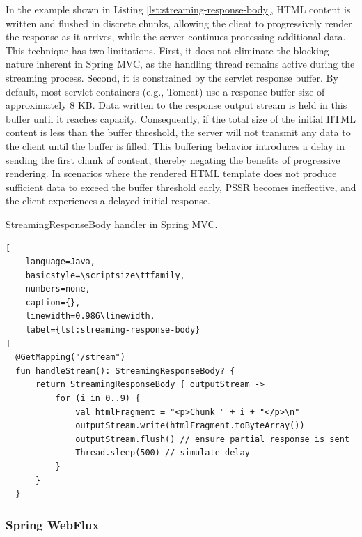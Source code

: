 \documentclass[software,article,accept,pdftex,moreauthors]{Definitions/mdpi}
\begin{document}
In the example shown in Listing \ref{lst:streaming-response-body}, HTML content is
written and flushed in discrete chunks, allowing the client to progressively
render the response as it arrives, while the server continues processing
additional data. This technique has two limitations. First, it does
not eliminate the blocking nature inherent in Spring MVC, as the handling
thread remains active during the streaming process. Second, it is constrained
by the servlet response buffer. By default, most servlet containers (e.g.,
Tomcat) use a response buffer size of approximately 8 KB. Data written to the
response output stream is held in this buffer until it reaches capacity.
Consequently, if the total size of the initial HTML content is less than the
buffer threshold, the server will not transmit any data to the client until the
buffer is filled. This buffering behavior introduces a delay in sending the
first chunk of content, thereby negating the benefits of progressive rendering.
In scenarios where the rendered HTML template does not produce sufficient data
to exceed the buffer threshold early, PSSR becomes ineffective, and the client
experiences a delayed initial response.

\begin{listing}[H]
\caption{StreamingResponseBody handler in Spring MVC.}
\begin{lstlisting}[
    language=Java,
    basicstyle=\scriptsize\ttfamily,
    numbers=none,
    caption={},
    linewidth=0.986\linewidth,
    label={lst:streaming-response-body}
]
  @GetMapping("/stream")
  fun handleStream(): StreamingResponseBody? {
      return StreamingResponseBody { outputStream ->
          for (i in 0..9) {
              val htmlFragment = "<p>Chunk " + i + "</p>\n"
              outputStream.write(htmlFragment.toByteArray())
              outputStream.flush() // ensure partial response is sent
              Thread.sleep(500) // simulate delay
          }
      }
  }
\end{lstlisting}
\end{listing}

\subsubsection{Spring WebFlux}
\end{document}
